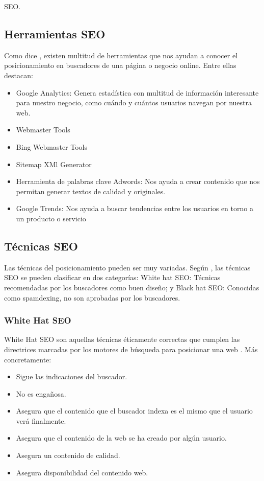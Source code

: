 \begin{section}{SEO.}
		\subsection{Herramientas SEO}
		
		Como dice \cite{seoc}, existen multitud de herramientas que nos ayudan a conocer el posicionamiento en buscadores de una página o negocio online. Entre ellas destacan:
		\begin{itemize}
			\item Google Analytics: Genera estadística con multitud de información interesante para nuestro negocio,  como cuándo y cuántos usuarios navegan por nuestra web.
			\item Webmaster Tools
			\item Bing Webmaster Tools
			\item Sitemap XMl Generator
			\item Herramienta de palabras clave Adwords: Nos ayuda a crear contenido que nos permitan generar textos de calidad y originales.
			\item Google Trends: Nos ayuda a buscar tendencias entre los usuarios en torno a un producto o servicio
		\end{itemize}
		
		\subsection{Técnicas SEO}
		Las técnicas del posicionamiento pueden ser muy variadas. Según \cite{tutorial}, las técnicas SEO se pueden clasificar en dos categorías: White hat SEO: Técnicas recomendadas por los buscadores como buen diseño; y Black hat SEO: Conocidas como spamdexing, no son aprobadas por los buscadores.

		\subsubsection{White Hat SEO}
		White Hat SEO son aquellas técnicas éticamente correctas que cumplen las directrices marcadas por los motores de búsqueda para posicionar una web \cite{cod}. Más concretamente:
		\begin{itemize}
			\item Sigue las indicaciones del buscador.
			\item No es engañosa.
			\item Asegura que el contenido que el buscador indexa es el mismo que el usuario verá finalmente.
			\item Asegura que el contenido de la web se ha creado por algún usuario.
			\item Asegura un contenido de calidad.
			\item Asegura disponibilidad del contenido web.
		\end{itemize}
		

\end{section}
